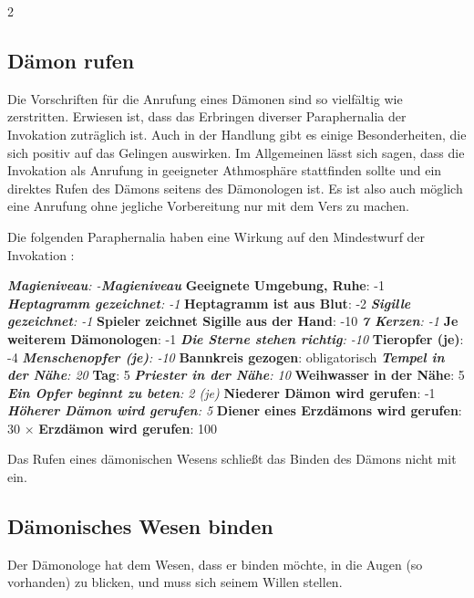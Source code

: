 \begin{multicols*}{2}


\subsection{Dämon rufen}

Die Vorschriften für die Anrufung eines Dämonen sind so vielfältig wie zerstritten. Erwiesen ist, dass das Erbringen diverser Paraphernalia der Invokation zuträglich ist. Auch in der Handlung gibt es einige Besonderheiten, die sich positiv auf das Gelingen auswirken. Im Allgemeinen lässt sich sagen, dass die Invokation als Anrufung in geeigneter Athmosphäre stattfinden sollte und ein direktes Rufen des Dämons seitens des Dämonologen ist. Es ist also auch möglich eine Anrufung ohne jegliche Vorbereitung nur mit dem Vers zu machen.

Die folgenden Paraphernalia haben eine Wirkung auf den Mindestwurf der Invokation :

\textit{ \textbf{Magieniveau}: -\textbf{Magieniveau} } \textbf{Geeignete Umgebung, Ruhe}: -1 \textit{ \textbf{Heptagramm gezeichnet}: -1 } \textbf{Heptagramm ist aus Blut}: -2 \textit{ \textbf{Sigille gezeichnet}: -1 } \textbf{Spieler zeichnet Sigille aus der Hand}: -10 \textit{ \textbf{7 Kerzen}: -1 } \textbf{Je weiterem Dämonologen}: -1 \textit{ \textbf{Die Sterne stehen richtig}: -10 } \textbf{Tieropfer (je)}: -4 \textit{ \textbf{Menschenopfer (je)}: -10 } \textbf{Bannkreis gezogen}: obligatorisch \textit{ \textbf{Tempel in der Nähe}: 20 } \textbf{Tag}: 5 \textit{ \textbf{Priester in der Nähe}: 10 } \textbf{Weihwasser in der Nähe}: 5 \textit{ \textbf{Ein Opfer beginnt zu beten}: 2 (je)  } \textbf{Niederer Dämon wird gerufen}: -1 \textit{ \textbf{Höherer Dämon wird gerufen}: 5 } \textbf{Diener eines Erzdämons wird gerufen}: 30 × \textbf{Erzdämon wird gerufen}: 100

Das Rufen eines dämonischen Wesens schließt das Binden des Dämons nicht mit ein.



\subsection{Dämonisches Wesen binden}

Der Dämonologe hat dem Wesen, dass er binden möchte, in die Augen (so vorhanden) zu blicken, und muss sich seinem Willen stellen.


\end{multicols*}
